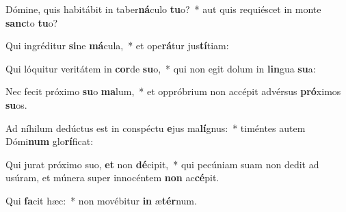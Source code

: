 \item Dómine, quis habitábit in taber\textbf{ná}culo \textbf{tu}o?~* aut quis requiéscet in monte \textbf{sanc}to \textbf{tu}o?
\item Qui ingréditur \textbf{si}ne \textbf{má}cula,~* et ope\textbf{rá}tur jus\textbf{tí}tiam:
\item Qui lóquitur veritátem in \textbf{cor}de \textbf{su}o,~* qui non egit dolum in \textbf{lin}gua \textbf{su}a:
\item Nec fecit próximo \textbf{su}o \textbf{ma}lum,~* et oppróbrium non accépit advérsus \textbf{pró}ximos \textbf{su}os.
\item Ad níhilum dedúctus est in conspéctu \textbf{e}jus ma\textbf{lí}gnus:~* timéntes autem Dómi\textbf{num} glo\textbf{rí}ficat:
\item Qui jurat próximo suo, \textbf{et} non \textbf{dé}cipit,~* qui pecúniam suam non dedit ad usúram, et múnera super innocéntem \textbf{non} ac\textbf{cé}pit.
\item Qui \textbf{fa}cit hæc:~* non movébitur \textbf{in} æ\textbf{tér}num.
